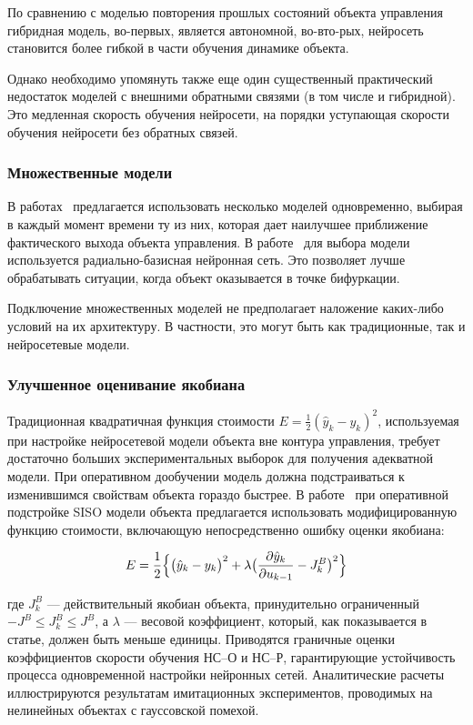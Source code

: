 По сравнению с моделью повторения прошлых состояний объекта управления
гибридная модель, во-первых, является автономной, во-{вто-рых}, нейросеть
становится более гибкой в части обучения динамике объекта.

Однако необходимо упомянуть также еще один существенный практический
недостаток моделей с внешними обратными связями (в том числе и
гибридной).  Это медленная скорость обучения нейросети, на порядки
уступающая скорости обучения нейросети без обратных связей.

\subsubsection{Множественные модели}

В работах~\cite{narmuk96,ronco98} предлагается использовать
несколько моделей одновременно, выбирая в каждый момент времени ту из
них, которая дает наилучшее приближение фактического выхода объекта
управления.  В работе~\cite{ronco98} для выбора модели используется
радиально-базисная нейронная сеть.  Это позволяет лучше обрабатывать
ситуации, когда объект оказывается в точке бифуркации.

Подключение множественных моделей не предполагает наложение каких-либо
условий на их архитектуру.  В частности, это могут быть как
традиционные, так и нейросетевые модели.

\subsubsection{Улучшенное оценивание якобиана}

Традиционная квадратичная функция стоимости $E=\frac{1}{2}(\hat{y}_k -
y_k)^2$, используемая при настройке нейросетевой модели объекта вне
контура управления, требует достаточно больших экспериментальных
выборок для получения адекватной модели.  При оперативном дообучении
модель должна подстраиваться к изменившимся свойствам объекта гораздо
быстрее.  В работе~\cite{wangbao00} при оперативной подстройке SISO
модели объекта предлагается использовать модифицированную функцию
стоимости, включающую непосредственно ошибку оценки якобиана:

$$
E=\frac{1}{2}\Bigl\{\bigl(\hat{y}_k - y_k\bigr)^2 +
  \lambda\bigl(\frac{\partial\hat{y}_k}{\partial u_{k-1}} -
  J^B_k\bigr)^2\Bigr\}
$$

\noindent где $J^B_k$ --- действительный якобиан объекта, принудительно
ограниченный $-J^B\le J^B_k\le J^B$, а $\lambda$ --- весовой
коэффициент, который, как показывается в статье, должен быть меньше
единицы.  Приводятся граничные оценки коэффициентов скорости обучения
НС--О и НС--Р, гарантирующие устойчивость процесса одновременной
настройки нейронных сетей.  Аналитические расчеты иллюстрируются
результатам имитационных экспериментов, проводимых на нелинейных
объектах с гауссовской помехой.

